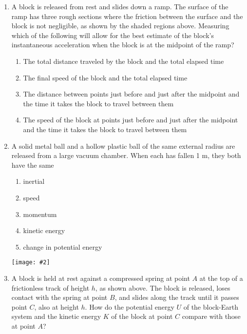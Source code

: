 \documentclass[11pt]{article}
\newcommand{\pic}[2]{\texttt{[image: \#2]}}
\begin{document}
\begin{multicols}{2}
\begin{enumerate}[leftmargin=18pt]
    \begin{center}
      \pic{.35}{rough-ramp}
    \end{center}
  \item A block is released from rest and slides down a ramp. The surface of
    the ramp has three rough sections where the friction between the surface
    and the block is not negligible, as shown by the shaded regions above.
    Measuring which of the following will allow for the best estimate of the
    block's instantaneous acceleration when the block is at the midpoint of the
    ramp?
    \begin{enumerate}[nosep,leftmargin=18pt,label=(\Alph*)]
    \item The total distance traveled by the block and the total elapsed time
    \item The final speed of the block and the total elapsed time
    \item The distance between points just before and just after the midpoint
      and the time it takes the block to travel between them
    \item The speed of the block at points just before and just after the
      midpoint and the time it takes the block to travel between them
    \end{enumerate}
    \vspace{.7in}
    
  \item A solid metal ball and a hollow plastic ball of the same external
    radius are released from a large vacuum chamber. When each has fallen 1 m,
    they both have the same
    \begin{enumerate}[nosep,leftmargin=18pt,label=(\Alph*)]
    \item inertial
    \item speed
    \item momentum
    \item kinetic energy
    \item change in potential energy
    \end{enumerate}
    \vspace{.75in}
    \columnbreak
    
    \begin{center}
      \pic{.4}{spring-block}
    \end{center}
  \item A block is held at rest against a compressed spring at point $A$ at the
    top of a frictionless track of height $h$, as shown above. The block is
    released, loses contact with the spring at point $B$, and slides along the
    track until it passes point $C$, also at height $h$. How do the potential
    energy $U$ of the block-Earth system and the kinetic energy $K$ of the block
    at point $C$ compare with those at point $A$?


\end{enumerate}
\end{multicols}
\end{document}
